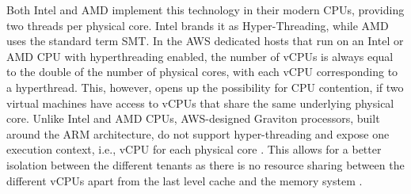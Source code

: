 \noindent
Both Intel and AMD implement this technology in their modern CPUs, providing two threads per physical core. 
Intel brands it as Hyper-Threading, while AMD uses the standard term \ac{SMT}. In the AWS dedicated hosts that run on an Intel or 
AMD CPU with hyperthreading enabled, the number of vCPUs is always equal to the double of the number of 
physical cores, with each vCPU corresponding to a hyperthread. This, however, opens up the possibility 
for CPU contention, if two virtual machines have access to vCPUs that share the same underlying physical core. 
Unlike Intel and AMD CPUs, AWS-designed Graviton processors, built around the ARM architecture, 
do not support hyper-threading and expose one execution context, i.e., vCPU for 
each physical core \cite{graviton}. This allows for a better isolation between the different tenants as 
there is no resource sharing between the different vCPUs apart from the last level cache and the memory 
system \cite{graviton}. 
